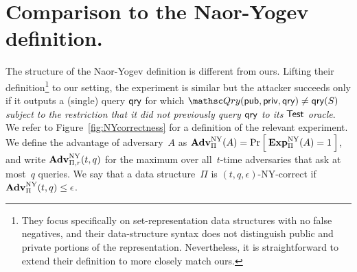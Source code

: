 \section{Comparison to the Naor-Yogev definition.}
The structure of the Naor-Yogev definition is different from ours.
Lifting their definition\footnote{They focus specifically on set-representation data
structures
with no false negatives, and their data-structure syntax
does not distinguish public and private portions of the representation. Nevertheless, it is straightforward
to extend their definition to more closely match ours.}
to our setting,
the experiment is similar but the attacker
succeeds only if it outputs a (single) query $\mathsf{qry}$ for which
$\Qry(\pubaux,\privaux, \qry) \neq \qry(S)$  \emph{subject to the restriction that it did not
previously query $\mathsf{qry}$ to its $\mathsf{Test}$ oracle}. We refer to
Figure~\ref{fig:NYcorrectness} for a definition of the relevant experiment.
We define the advantage of adversary~$A$ as
$\mathrm{\mathbf{Adv}}^{\mathrm{NY}}_{\Pi}(A) = \Pr\left[\: \mathrm{\mathbf{Exp}}^{\mathrm{NY}}_{\Pi}(A)=1 \:\right]$,
and write $\mathrm{\mathbf{Adv}}^{\mathrm{NY}}_{\Pi,r}(t,q)$ for the maximum over
all~$t$-time adversaries that ask at most~$q$ queries. We say that a
data structure~$\Pi$ is $(t,q,\epsilon)$-NY-correct if
$\mathrm{\mathbf{Adv}}^{\mathrm{NY}}_{\Pi}(t,q) \leq \epsilon$. 


